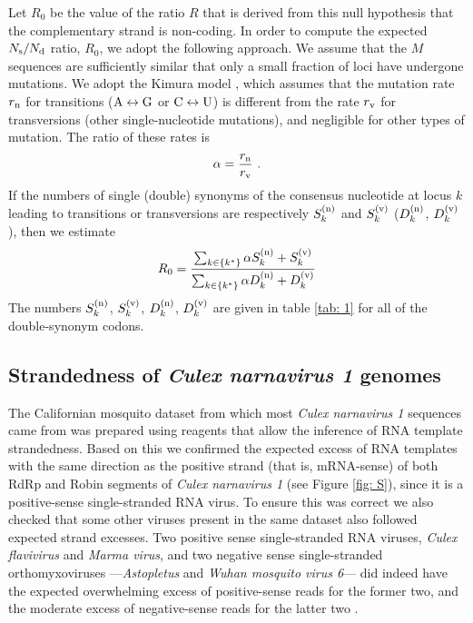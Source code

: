 \documentclass[unnumsec,webpdf,contemporary,large]{oup-authoring-template}%
\theoremstyle{thmstyleone}%
\theoremstyle{thmstyletwo}%
\theoremstyle{thmstylethree}%
\begin{document}
Let $R_0$ be the value of the ratio $R$ that is derived from this null hypothesis that
the complementary strand is non-coding.
In order to compute the expected $N_{\rm s}/N_{\rm d}$ ratio, $R_0$, we adopt the following
approach. We assume that the $M$ sequences are sufficiently similar
that only a small fraction of loci have undergone mutations.
We adopt the Kimura model \citep{Kim80}, which assumes that the mutation
rate $r_{\rm n}$ for transitions (${\rm A}\leftrightarrow {\rm G}$ or ${\rm C}\leftrightarrow{\rm U}$)
is different from the rate $r_{\rm v}$ for transversions (other single-nucleotide mutations), and negligible for
other types of mutation. The ratio of these rates is
%
\begin{equation}
\label{eq: 6.6}
\alpha=\frac{r_{\rm n}}{r_{\rm v}}
\ .
\end{equation}
%
If the numbers of single (double) synonyms of the consensus nucleotide at locus $k$ leading to
transitions or transversions are respectively $S^{({\rm n})}_k$ and $S^{({\rm v})}_k$
($D^{({\rm n})}_k$, $D^{({\rm v})}_k$), then we estimate
%
\begin{equation}
\label{eq: 4.7}
R_0=
\frac{\sum_{k\in\{k^\ast\}}\alpha S_k^{({\rm n})}+S^{({\rm v})}_k}
{\sum_{k\in\{k^\ast\}}\alpha D^{({\rm n})}_k+D_k^{({\rm v})}}
\end{equation}
%
The numbers $S^{({\rm n})}_k$, $S^{({\rm v})}_k$, $D^{({\rm n})}_k$, $D^{({\rm v})}_k$ are given
in table \ref{tab: 1} for all of the double-synonym codons.


\subsection{\textbf{Strandedness of \emph{Culex narnavirus 1} genomes}}
\label{sec: 4.4}

The Californian mosquito dataset \citep{Bat+20} from which most \emph{Culex
narnavirus 1} sequences came from was prepared using reagents that allow the
inference of RNA template strandedness. Based on this we confirmed the expected
excess of RNA templates with the same direction as the positive strand (that
is, mRNA-sense) of both RdRp and Robin segments of \emph{Culex narnavirus 1}
(see Figure \ref{fig: S}), since it is a positive-sense single-stranded RNA
virus. To ensure this was correct we also checked that some other viruses
present in the same dataset also followed expected strand excesses. Two
positive sense single-stranded RNA viruses, \emph{Culex flavivirus} and \emph{Marma virus},
and two negative sense single-stranded orthomyxoviruses ---\emph{Astopletus}
and \emph{Wuhan mosquito virus 6}--- did indeed have the expected overwhelming
excess of positive-sense reads for the former two, and the moderate excess of
negative-sense reads for the latter two \citep{waldron+18}.
\end{document}
